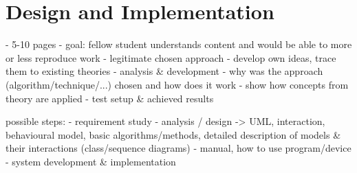 \chapter{Design and Implementation}

- 5-10 pages
- goal: fellow student understands content and would be able to more or less reproduce work
- legitimate chosen approach
- develop own ideas, trace them to existing theories
- analysis & development
- why was the approach (algorithm/technique/...) chosen and how does it work
- show how concepts from theory are applied
- test setup & achieved results

possible steps:
- requirement study
- analysis / design -> UML, interaction, behavioural model, basic algorithms/methods, detailed description of models & their interactions (class/sequence diagrams)
- manual, how to use program/device
- system development & implementation
